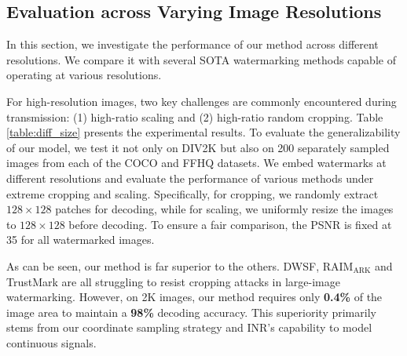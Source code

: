\documentclass{article}
\begin{document}
\subsection{Evaluation across Varying Image Resolutions}
In this section, we investigate the performance of our method across different resolutions. We compare it with several SOTA watermarking methods capable of operating at various resolutions. 

For high-resolution images, two key challenges are commonly encountered during transmission: (1) high-ratio scaling and (2) high-ratio random cropping. Table \ref{table:diff_size} presents the experimental results. To evaluate the generalizability of our model, we test it not only on DIV2K but also on 200 separately sampled images from each of the COCO \cite{lin2014microsoft} and FFHQ \cite{karras2019style} datasets.
We embed watermarks at different resolutions and evaluate the performance of various methods under extreme cropping and scaling. Specifically, for cropping, we randomly extract \(128 \times 128\) patches for decoding, while for scaling, we uniformly resize the images to \(128 \times 128\) before decoding. To ensure a fair comparison, the PSNR is fixed at 35 for all watermarked images. 


As can be seen, our method is far superior to the others. DWSF, RAIM$_{\mathrm{ARK}}$  and TrustMark are all struggling to resist cropping attacks in large-image watermarking. However, on 2K images, our method requires only \textbf{0.4\%} of the image area to maintain a \textbf{98\%} decoding accuracy. This superiority primarily stems from our coordinate sampling strategy and INR’s capability to model continuous signals.
\end{document}
